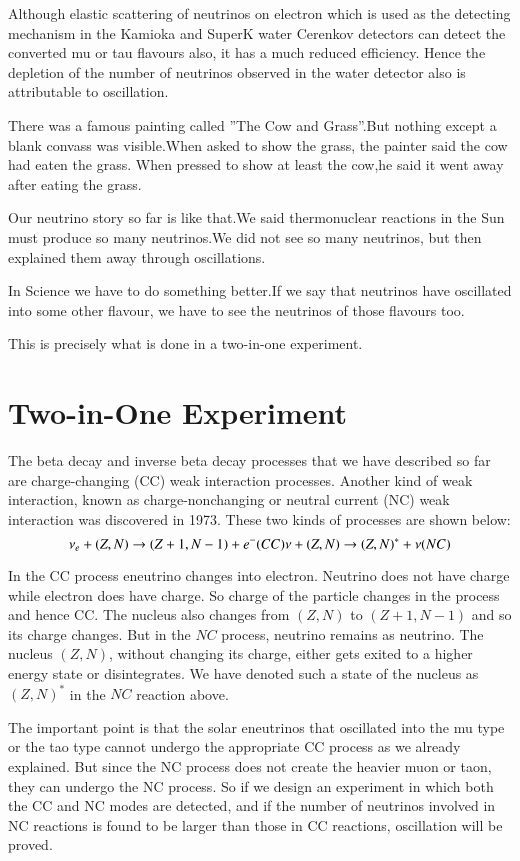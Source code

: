 Although elastic scattering of neutrinos on electron which is used as the
detecting mechanism in the Kamioka and SuperK water Cerenkov detectors can detect the converted mu or tau flavours also, it has a much reduced
efficiency. Hence the depletion of the number of neutrinos observed in the
water detector also is attributable to oscillation.

There was a famous painting called ”The Cow and Grass”.But nothing
except a blank convass was visible.When asked to show the grass, the painter
said the cow had eaten the grass. When pressed to show at least the cow,he
said it went away after eating the grass.

Our neutrino story so far is like that.We said thermonuclear reactions in
the Sun must produce so many neutrinos.We did not see so many neutrinos,
but then explained them away through oscillations.

In Science we have to do something better.If we say that neutrinos have
oscillated into some other flavour, we have to see the neutrinos of those
flavours too.

This is precisely what is done in a two-in-one experiment.

\section{Two-in-One Experiment}

The beta decay and inverse beta decay processes that we have described
so far are charge-changing (CC) weak interaction processes. Another kind
of weak interaction, known as charge-non\break changing or neutral current (NC)
weak interaction was discovered in 1973. These two kinds of processes are
shown below:
$$
\nu_{e} + (Z, N) \rightarrow (Z + 1, N -1) + e^{-} (CC)\\
\nu + (Z, N) \rightarrow (Z, N)^{\ast} + \nu (NC)
$$

In the CC process eneutrino changes into electron. Neutrino does not have
charge while electron does have charge. So charge of the particle changes in
the process and hence CC. The nucleus also changes from $(Z,N)$ to $(Z+1,
N-1)$ and so its charge changes. But in the $NC$ process, neutrino remains as
neutrino. The nucleus $(Z,N)$, without changing its charge, either gets exited
to a higher energy state or disintegrates. We have denoted such a state of
the nucleus as $(Z, N)^{\ast}$ in the $NC$ reaction above.

The important point is that the solar eneutrinos that oscillated into the
mu type or the tao type cannot undergo the appropriate CC process as we
already explained. But since the NC process does not create the heavier muon
or taon, they can undergo the NC process. So if we design an experiment
in which both the CC and NC modes are detected, and if the number of neutrinos involved in NC reactions is found to be larger than those in CC
reactions, oscillation will be proved.

